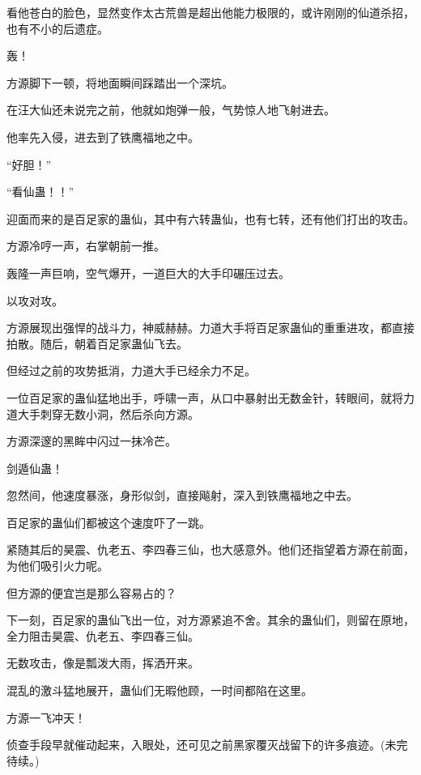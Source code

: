 \begin{this_body}
看他苍白的脸色，显然变作太古荒兽是超出他能力极限的，或许刚刚的仙道杀招，也有不小的后遗症。

轰！

方源脚下一顿，将地面瞬间踩踏出一个深坑。

在汪大仙还未说完之前，他就如炮弹一般，气势惊人地飞射进去。

他率先入侵，进去到了铁鹰福地之中。

“好胆！”

“看仙蛊！！”

迎面而来的是百足家的蛊仙，其中有六转蛊仙，也有七转，还有他们打出的攻击。

方源冷哼一声，右掌朝前一推。

轰隆一声巨响，空气爆开，一道巨大的大手印碾压过去。

以攻对攻。

方源展现出强悍的战斗力，神威赫赫。力道大手将百足家蛊仙的重重进攻，都直接拍散。随后，朝着百足家蛊仙飞去。

但经过之前的攻势抵消，力道大手已经余力不足。

一位百足家的蛊仙猛地出手，呼啸一声，从口中暴射出无数金针，转眼间，就将力道大手刺穿无数小洞，然后杀向方源。

方源深邃的黑眸中闪过一抹冷芒。

剑遁仙蛊！

忽然间，他速度暴涨，身形似剑，直接飚射，深入到铁鹰福地之中去。

百足家的蛊仙们都被这个速度吓了一跳。

紧随其后的昊震、仇老五、李四春三仙，也大感意外。他们还指望着方源在前面，为他们吸引火力呢。

但方源的便宜岂是那么容易占的？

下一刻，百足家的蛊仙飞出一位，对方源紧追不舍。其余的蛊仙们，则留在原地，全力阻击昊震、仇老五、李四春三仙。

无数攻击，像是瓢泼大雨，挥洒开来。

混乱的激斗猛地展开，蛊仙们无暇他顾，一时间都陷在这里。

方源一飞冲天！

侦查手段早就催动起来，入眼处，还可见之前黑家覆灭战留下的许多痕迹。(未完待续。)

\end{this_body}

